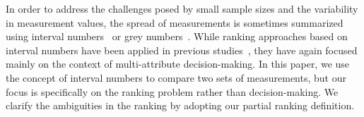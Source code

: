 \documentclass[acmsmall,screen, review]{acmart}
\begin{document}

In order to address the challenges posed by small sample sizes and the variability in measurement values, the spread of measurements is sometimes summarized using interval numbers~\cite{zhang2016ranking} or grey numbers~\cite{liu2014ranking}. While ranking approaches based on interval numbers have been applied in previous studies~\cite{liu2014ranking, ye2016method}, they have again focused mainly on the context of multi-attribute decision-making. In this paper,  we use the concept of interval numbers to compare two sets of measurements, but our focus is specifically on the ranking problem rather than decision-making. We clarify the ambiguities in the ranking by adopting our partial ranking definition. 

\end{document}
